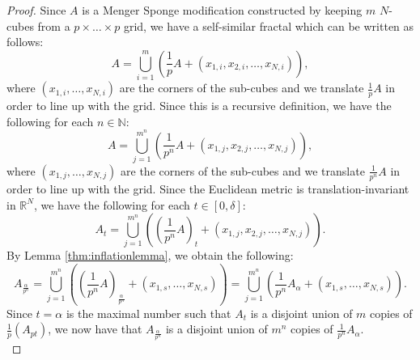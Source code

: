 \documentclass{article}
\theoremstyle{plain}
\numberwithin{equation}{section}
\numberwithin{table}{section}
\numberwithin{figure}{section}
\begin{document}
\begin{proof}
Since $A$ is a Menger Sponge modification constructed by keeping $m$ $N$-cubes from a $p\times\dots\times p$ grid, we have a self-similar fractal which can be written as follows:
\begin{equation}
A = \bigcup_{i=1}^m \left(\frac{1}{p} A + (x_{1,i},x_{2,i},\dots,x_{N,i})\right),
\end{equation}
where $(x_{1,i},\dots,x_{N,i})$ are the corners of the sub-cubes and we translate $\frac{1}{p} A$ in order to line up with the grid. Since this is a recursive definition, we have the following for each $n \in \mathbb{N}$:
\begin{equation}
A = \bigcup_{j=1}^{m^n} \left(\frac{1}{p^n} A + (x_{1,j},x_{2,j},\dots,x_{N,j})\right),
\end{equation}
where $(x_{1,j},\dots,x_{N,j})$ are the corners of the sub-cubes and we translate $\frac{1}{p^n} A$ in order to line up with the grid. Since the Euclidean metric is translation-invariant in $\mathbb{R}^N$, we have the following for each $t \in [0,\delta]$:
\begin{equation} \label{eq:selfsimilardefnd}
A_t = \bigcup_{j=1}^{m^n} \left(\left(\frac{1}{p^n} A\right)_t + (x_{1,j},x_{2,j},\dots,x_{N,j})\right).
\end{equation}
By Lemma \ref{thm:inflationlemma}, we obtain the following:
\begin{equation}
A_{\frac{\alpha}{p^n}} = \bigcup_{j=1}^{m^n} \left(\left(\frac{1}{p^n} A\right)_{\frac{\alpha}{p^n}} + (x_{1,s},\dots,x_{N,s})\right)
= \bigcup_{j=1}^{m^n} \left(\frac{1}{p^n} A_{\alpha} + (x_{1,s},\dots,x_{N,s})\right).
\end{equation}
Since $t = \alpha$ is the maximal number such that $A_t$ is a disjoint union of $m$ copies of $\frac{1}{p} \left(A_{pt}\right)$, we now have that $A_{\frac{\alpha}{p^n}}$ is a disjoint union of $m^n$ copies of $\frac{1}{p^n} A_{\alpha}$. \\


\end{proof}
\end{document}
